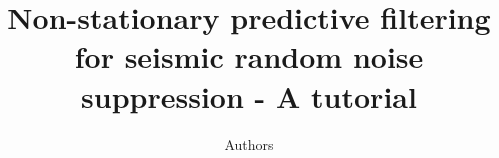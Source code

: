 

\title{Non-stationary predictive filtering for seismic random noise suppression - A tutorial}
\author{Authors}


\renewcommand{\thefootnote}{\fnsymbol{footnote}}




